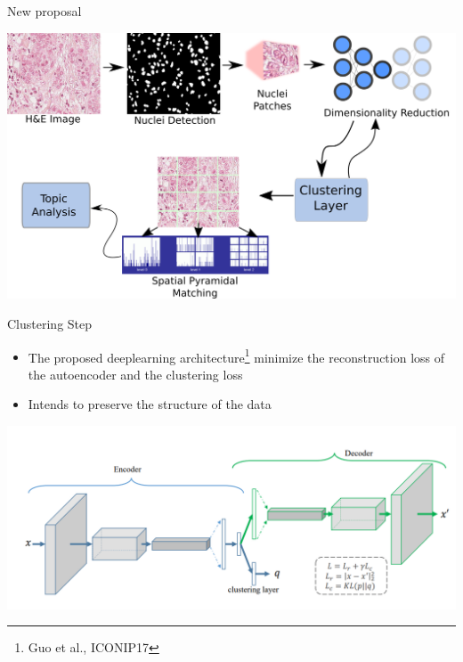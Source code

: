 \documentclass[usenames,dvipsnames]{beamer}
\let\oldfootnote\footnote
\renewcommand\footnote[1][]{\footnotesize\oldfootnote[frame,#1]}
\renewcommand{\footnotesize}{\tiny}
\begin{document}
\begin{frame}{New proposal}

\includegraphics[width = \textwidth]{imagenes/newproposalSP.png}


\end{frame}

\begin{frame}{Clustering Step}
\begin{itemize}
 \item The proposed deeplearning architecture\footnote{Guo et al., ICONIP17 } \normalsize minimize the reconstruction loss of the autoencoder and the clustering loss
 \item Intends to preserve the structure of the data
\end{itemize}
\includegraphics[width = \textwidth]{imagenes/ClusterinLayer.png}

\end{frame}
\end{document}
